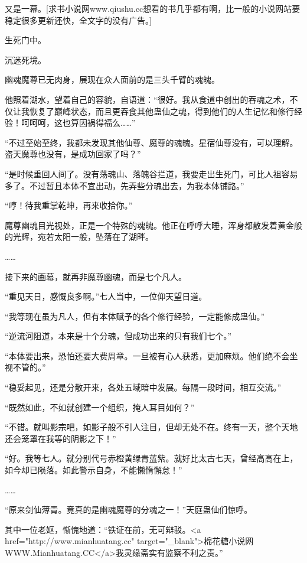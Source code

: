 
\begin{this_body}

又是一幕。[求书小说网www.qiushu.cc想看的书几乎都有啊，比一般的小说网站要稳定很多更新还快，全文字的没有广告。]

生死门中。

沉迷死境。

幽魂魔尊已无肉身，展现在众人面前的是三头千臂的魂魄。

他照着湖水，望着自己的容貌，自语道：“很好。我从食道中创出的吞魂之术，不仅让我恢复了巅峰状态，而且更吞食其他蛊仙之魂，得到他们的人生记忆和修行经验！呵呵呵，这也算因祸得福么……”

“不过至始至终，我都未发现其他仙尊、魔尊的魂魄。星宿仙尊没有，可以理解。盗天魔尊也没有，是成功回家了吗？”

“是时候重回人间了。没有荡魂山、落魄谷拦道，我要走出生死门，可比人祖容易多了。不过暂且本体不宜出动，先弄些分魂出去，为我本体铺路。”

“哼！待我重掌乾坤，再来收拾你。”

魔尊幽魂目光视处，正是一个特殊的魂魄。他正在呼呼大睡，浑身都散发着黄金般的光辉，宛若太阳一般，坠落在了湖畔。

……

接下来的画幕，就再非魔尊幽魂，而是七个凡人。

“重见天日，感慨良多啊。”七人当中，一位仰天望日道。

“我等现在虽为凡人，但有本体赋予的各个修行经验，一定能修成蛊仙。”

“逆流河阻道，本来是十个分魂，但成功出来的只有我们七个。”

“本体要出来，恐怕还要大费周章。一旦被有心人获悉，更加麻烦。他们绝不会坐视不管的。”

“稳妥起见，还是分散开来，各处五域暗中发展。每隔一段时间，相互交流。”

“既然如此，不如就创建一个组织，掩人耳目如何？”

“不错。就叫影宗吧，如影子般不引人注目，但却无处不在。终有一天，整个天地还会笼罩在我等的阴影之下！”

“好。我等七人。就分别代号赤橙黄绿青蓝紫。就好比太古七天，曾经高高在上，如今却已陨落。如此警示自身，不能懒惰懈怠！”

……

“原来剑仙薄青。竟真的是幽魂魔尊的分魂之一！”天庭蛊仙们惊呼。

其中一位老妪，惭愧地道：“铁证在前，无可辩驳。<a href="http://www.mianhuatang.cc" target="\_blank">棉花糖小说网WWW.Mianhuatang.CC</a>我灵缘斋实有监察不利之责。”


\end{this_body}

